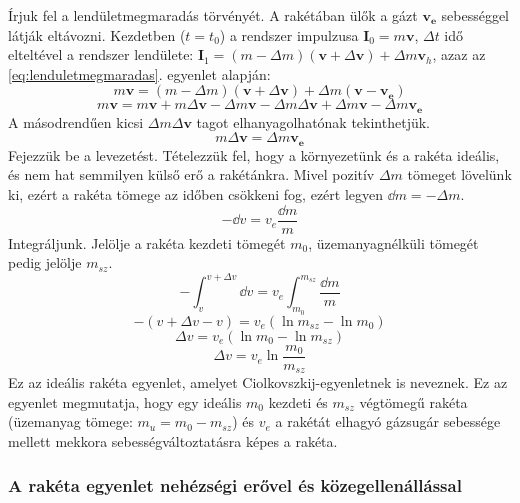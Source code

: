 \documentclass[12pt]{article}
\renewcommand{\vec}[1]{\mathbf{#1}} %
\begin{document}
Írjuk fel a lendületmegmaradás törvényét. A rakétában ülők a gázt $\vec{v_e}$ sebességgel látják eltávozni. Kezdetben ($t = t_0$) a rendszer impulzusa $\vec{I}_0 = m\vec{v}$, $\Delta t$ idő elteltével a rendszer lendülete:
$\vec{I}_1 =(m - \Delta m)(\vec{v} + \Delta \vec{v}) + \Delta m \vec{v}_h$, azaz az \ref{eq:lenduletmegmaradas}. egyenlet alapján:
\begin{equation*}
  m\vec{v} = (m - \Delta m)(\vec{v} + \Delta \vec{v}) + \Delta m (\vec{v}-\vec{v_e})
\end{equation*}
\begin{equation*}
  m\vec{v} = m\vec{v} + m\Delta\vec{v} - \Delta m \vec{v} - \Delta m \Delta \vec{v} + \Delta m\vec{v} - \Delta m \vec{v_e}
\end{equation*}
A másodrendűen kicsi $\Delta m \Delta \vec{v}$ tagot elhanyagolhatónak tekinthetjük.
\begin{equation}
    m\Delta\vec{v} = \Delta m \vec{v_e}
    \label{eq:mdv-eq-dmve}
\end{equation}
Fejezzük be a levezetést. Tételezzük fel, hogy a környezetünk és a rakéta ideális, és nem hat semmilyen külső erő a rakétánkra. Mivel pozitív $\Delta m$ tömeget lövelünk ki, ezért a rakéta tömege az időben csökkeni fog, ezért legyen $\dd{m} = - \Delta m$.
\[-\dd{v} = v_e\frac{\dd{m}}{m}\]
Integráljunk. Jelölje a rakéta kezdeti tömegét $m_0$, üzemanyagnélküli tömegét pedig jelölje $m_{sz}$.
\[-\int_v^{v+\Delta v} \dd{v} = v_e \int_{m_0}^{m_{sz}} \frac{\dd{m}}{m}\]
\[-(v + \Delta v - v) = v_e\left(\ln{m_{sz}} - \ln m_0\right) \] 
\[\Delta v = v_e(\ln m_0 - \ln m_{sz})\]
\begin{equation}
    \Delta v = v_e\ln{\dfrac{m_0}{m_{sz}}}
\end{equation}
Ez az ideális rakéta egyenlet, amelyet Ciolkovszkij-egyenletnek is neveznek. Ez az egyenlet megmutatja, hogy egy ideális $m_0$ kezdeti és $m_{sz}$ végtömegű rakéta (üzemanyag tömege: $m_u = m_0 - m_{sz}$) és
$v_e$ a rakétát elhagyó gázsugár sebessége mellett mekkora sebességváltoztatásra képes a rakéta.

\subsubsection{A rakéta egyenlet nehézségi erővel és közegellenállással}
\end{document}
